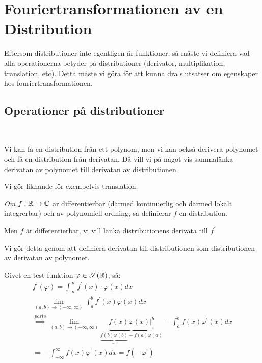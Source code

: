 \section{Fouriertransformationen av en Distribution}\par
\noindent Eftersom distributioner inte egentligen är funktioner, så måste vi definiera vad alla operationerna betyder på distributioner (derivator, multiplikation, translation, etc). Detta måste vi göra för att kunna dra slutsatser om egenskaper hos fouriertransformationen.
\par\bigskip
\subsection{Operationer på distributioner}\hfill\\\par
\noindent Vi kan få en distribution från ett polynom, men vi kan också derivera polynomet och få en distribution från derivatan. Då vill vi på något vis sammalänka derivatan av polynomet till derivatan av distributionen.\par
\noindent Vi gör liknande för exempelvis translation.
\par\bigskip
\noindent\textit{Om} $f:\mathbb{R}\to\mathbb{C}$ är differentierbar (därmed kontinuerlig och därmed lokalt integrerbar) och av polynomiell ordning, så definierar $f$ en distribution.\par
\noindent Men $f$ är differentierbar, vi vill länka distributionens derivata till $f^{\prime}$\par
\noindent Vi gör detta genom att definiera derivatan till distributionen som distributionen av derivatan av polynomet.
\par\bigskip
\noindent Givet en test-funktion $\varphi\in\mathscr{S}(\mathbb{R})$, så:
\begin{equation*}
  \begin{gathered}
    f^{\prime}(\varphi) = \int_{\infty}^{\infty}f^{\prime}(x)\cdot\varphi(x)dx\\
    \lim_{(a,b)\to(-\infty,\infty)}\int_{a}^{b}f^{\prime}(x)\varphi(x)dx\\
    \stackrel{parts}{\implies}\lim_{(a,b)\to(-\infty,\infty)}\underbrace{f(x)\varphi(x)|_{_a}^b}_{\text{$\underbrace{f(b)\varphi(b)}_{\text{$=0$}}-f(a)\varphi(a)$}}-\int_{a}^{b}f(x)\varphi^{\prime}(x)dx\\
    \Rightarrow -\int_{-\infty}^{\infty}f(x)\varphi^{\prime}(x)dx = f(-\varphi^{\prime})
  \end{gathered}
\end{equation*}
